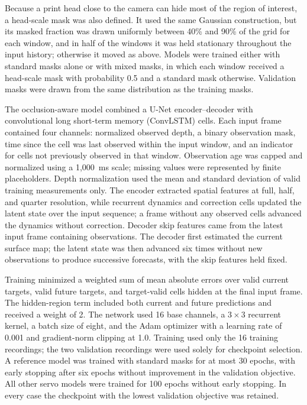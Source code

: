 Because a print head close to the camera can hide most of the region of interest, a head-scale mask was also defined. It used the same Gaussian construction, but its masked fraction was drawn uniformly between 40\% and 90\% of the grid for each window, and in half of the windows it was held stationary throughout the input history; otherwise it moved as above. Models were trained either with standard masks alone or with mixed masks, in which each window received a head-scale mask with probability 0.5 and a standard mask otherwise. Validation masks were drawn from the same distribution as the training masks.

The occlusion-aware model combined a U-Net encoder--decoder with convolutional long short-term memory (ConvLSTM) cells. Each input frame contained four channels: normalized observed depth, a binary observation mask, time since the cell was last observed within the input window, and an indicator for cells not previously observed in that window. Observation age was capped and normalized using a 1,000~ms scale; missing values were represented by finite placeholders. Depth normalization used the mean and standard deviation of valid training measurements only. The encoder extracted spatial features at full, half, and quarter resolution, while recurrent dynamics and correction cells updated the latent state over the input sequence; a frame without any observed cells advanced the dynamics without correction. Decoder skip features came from the latest input frame containing observations. The decoder first estimated the current surface map; the latent state was then advanced six times without new observations to produce successive forecasts, with the skip features held fixed.

Training minimized a weighted sum of mean absolute errors over valid current targets, valid future targets, and target-valid cells hidden at the final input frame. The hidden-region term included both current and future predictions and received a weight of 2. The network used 16 base channels, a $3 \times 3$ recurrent kernel, a batch size of eight, and the Adam optimizer with a learning rate of 0.001 and gradient-norm clipping at 1.0. Training used only the 16 training recordings; the two validation recordings were used solely for checkpoint selection. A reference model was trained with standard masks for at most 30 epochs, with early stopping after six epochs without improvement in the validation objective. All other servo models were trained for 100 epochs without early stopping. In every case the checkpoint with the lowest validation objective was retained.


